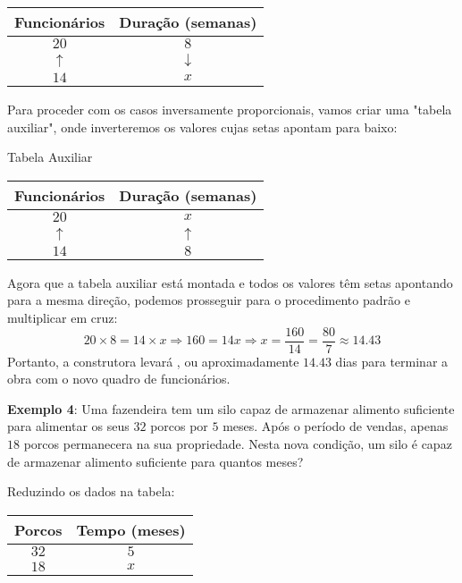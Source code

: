\documentclass[12pt]{report}
\newcommand{\1}{\faThermometerEmpty}
\newcommand{\2}{\faThermometerQuarter}
\newcommand{\3}{\faThermometerHalf}
\newcommand{\4}{\faThermometerThreeQuarters}
\newcommand{\5}{\faThermometerFull}
\begin{document}
\begin{center}
\begin{tabular}{|c | c|} 
 \hline
 Funcionários & Duração (semanas) \\ [0.5ex] 
 \hline \hline
 $20$ & $8$ \\ \hline
 $\uparrow$ &  $\downarrow$ \\ \hline
 $14$ & $x$ \\ 
 \hline
\end{tabular}
\end{center}

Para proceder com os casos inversamente proporcionais, vamos criar uma "tabela auxiliar", onde inverteremos os valores cujas setas apontam para baixo:

\begin{center}
{\footnotesize Tabela Auxiliar} \\
\begin{tabular}{|c | c|} 
 \hline
 Funcionários & Duração (semanas) \\ [0.5ex] 
 \hline \hline
 $20$ & $x$ \\ \hline
 $\uparrow$ &  $\uparrow$ \\ \hline
 $14$ & $8$ \\ 
 \hline
\end{tabular}
\end{center}

Agora que a tabela auxiliar está montada e todos os valores têm setas apontando para a mesma direção, podemos prosseguir para o procedimento padrão e multiplicar em cruz:
$$
20 \times 8 = 14 \times x \Rightarrow 160 = 14 x \Rightarrow x = \frac{160}{14} = \frac{80}{7} \approx 14.43
$$
Portanto, a construtora levará , ou aproximadamente $14.43$ dias para terminar a obra com o novo quadro de funcionários.

\vspace{10pt}
\textbf{Exemplo 4}: Uma fazendeira tem um silo capaz de armazenar alimento suficiente para alimentar os seus $32$ porcos por $5$ meses. Após o período de vendas, apenas $18$ porcos permanecera na sua propriedade. Nesta nova condição, um silo é capaz de armazenar alimento suficiente para quantos meses?

Reduzindo os dados na tabela:

\begin{center}
\begin{tabular}{|c | c|} 
 \hline
 Porcos & Tempo (meses) \\ [0.5ex] 
 \hline \hline
 $32$ & $5$ \\ \hline
 $18$ & $x$ \\ 
 \hline
\end{tabular}
\end{center}
\end{document}
